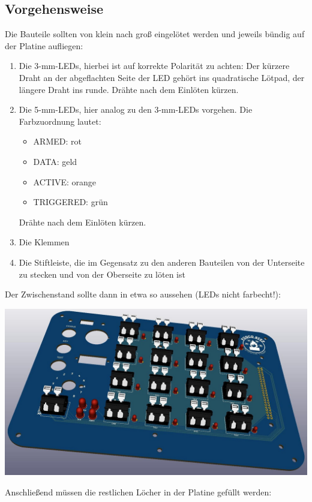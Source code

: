 \documentclass[paper=a4, open=any]{scrbook}
\begin{document}
				\subsection*{Vorgehensweise}
					Die Bauteile sollten von klein nach groß eingelötet werden und jeweils bündig auf der Platine aufliegen:
					\begin{enumerate}
						\item Die 3-mm-LEDs, hierbei ist auf korrekte Polarität zu achten: Der kürzere Draht an der abgeflachten Seite der LED gehört ins quadratische Lötpad, der längere Draht ins runde. Drähte nach dem Einlöten kürzen.
						\item Die 5-mm-LEDs, hier analog zu den 3-mm-LEDs vorgehen. Die Farbzuordnung lautet:
								\begin{itemize}
									\item ARMED: rot
									\item DATA: geld
									\item ACTIVE: orange
									\item TRIGGERED: grün
								\end{itemize}
								Drähte nach dem Einlöten kürzen.
						\item Die Klemmen
						\item Die Stiftleiste, die im Gegensatz zu den anderen Bauteilen von der Unterseite zu stecken und von der Oberseite zu löten ist
					\end{enumerate}

					Der Zwischenstand sollte dann in etwa so aussehen (LEDs nicht farbecht!): \\
					\begin{center}
						\includegraphics[width=.9\textwidth]{panel3d}
					\end{center}

					Anschließend müssen die restlichen Löcher in der Platine gefüllt werden:
\end{document}
